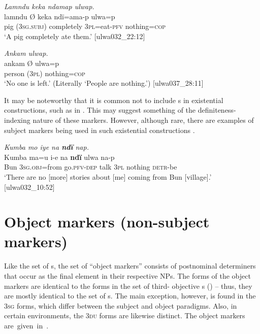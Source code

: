 \newpage

\ea%
    \label{ex:det:27}
          \textit{Lamndu keka ndamap ulwap.}\\
\gll lamndu  Ø      keka      ndï=ama-p    ulwa=p\\
    pig      (\textsc{3sg.subj)}  completely  3\textsc{pl}=eat-\textsc{pfv}  nothing=\textsc{cop}\\
\glt `A pig completely ate them.’ [ulwa032\_22:12]
\z

\ea%
    \label{ex:det:28}
          \textit{Ankam ulwap.}\\
\gll    ankam  Ø    ulwa=p\\
    person  (\textsc{3pl)}  nothing=\textsc{cop}\\
\glt `No one is left.’ (Literally ‘People are nothing.’) [ulwa037\_28:11]
\z

It may be noteworthy that it is common not to include s in   existential constructions, such as in . This may suggest something of the definiteness-indexing nature of these markers. However, although rare, there are examples of subject markers being used in such  existential constructions .


\ea%
    \label{ex:det:29}
          \textit{Kumba mo iye na \textbf{ndï} nap.}\\
\gll    Kumba  ma=u       i-e        na    \textbf{ndï}  ulwa    na-p\\
    Bun  3\textsc{sg.obj}=from  go.\textsc{pfv-dep}  talk  3\textsc{pl}  nothing  \textsc{detr}{}-be\\
\glt `There are no [more] stories about [me] coming from Bun [village].’ [ulwa032\_10:52]
\z

\section{Object markers (non-subject markers)}\label{sec:7.2}


Like the set of s, the set of “object markers” consists of postnominal determiners that occur as the final element in their respective NPs. The forms of the object markers are identical to the forms in the set of third- objective s () -- thus, they are mostly identical to the set of s. The main exception, however, is found in the \textsc{3sg} forms, which differ between the subject and object paradigms. Also, in certain  environments, the \textsc{3du} forms are likewise distinct. The object markers \mbox{are given in .}

